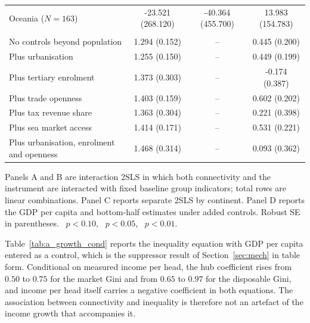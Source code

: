 \begin{table}[H]
\begin{threeparttable}
\begin{tabular}{lccc}
Oceania ($N=163$) & -23.521 (268.120) & -40.364 (455.700) & 13.983 (154.783) \\
\addlinespace\multicolumn{4}{l}{\emph{Panel D. Control sensitivity, 2SLS Feyrer, $\ln\mathrm{GACI}_{max}$}}\\
No controls beyond population & 1.294\sym{***} (0.152) & -- & 0.445\sym{**} (0.200) \\
Plus urbanisation & 1.255\sym{***} (0.150) & -- & 0.449\sym{**} (0.199) \\
Plus tertiary enrolment & 1.373\sym{***} (0.303) & -- & -0.174 (0.387) \\
Plus trade openness & 1.403\sym{***} (0.159) & -- & 0.602\sym{***} (0.202) \\
Plus tax revenue share & 1.363\sym{***} (0.304) & -- & 0.221 (0.398) \\
Plus sea market access & 1.414\sym{***} (0.171) & -- & 0.531\sym{**} (0.221) \\
Plus urbanisation, enrolment and openness & 1.468\sym{***} (0.314) & -- & 0.093 (0.362) \\
\bottomrule
\end{tabular}
\begin{tablenotes}\footnotesize\item Panels A and B are interaction 2SLS in which both connectivity and the instrument are interacted with fixed baseline group indicators; total rows are linear combinations. Panel C reports separate 2SLS by continent. Panel D reports the GDP per capita and bottom-half estimates under added controls. Robust SE in parentheses. \sym{*}~$p<0.10$, \sym{**}~$p<0.05$, \sym{***}~$p<0.01$.\end{tablenotes}\end{threeparttable}\end{table}

Table~\ref{tab:a_growth_cond} reports the inequality equation with GDP per capita entered as a control, which is the suppressor result of Section~\ref{sec:mech} in table form. Conditional on measured income per head, the hub coefficient rises from $0.50$ to $0.75$ for the market Gini and from $0.65$ to $0.97$ for the disposable Gini, and income per head itself carries a negative coefficient in both equations. The association between connectivity and inequality is therefore not an artefact of the income growth that accompanies it.

